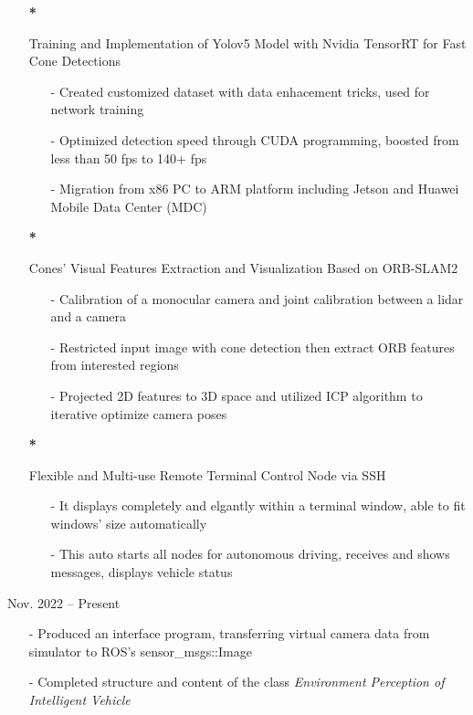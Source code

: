 \documentclass{resume}
\begin{document}
\begin{itemize}
  \item[\textbf{*}]{
    Training and Implementation of Yolov5 Model with Nvidia TensorRT for Fast Cone Detections 
    \begin{itemize}
      \item[-] Created customized dataset with data enhacement tricks, used for network training
      \item[-] Optimized detection speed through CUDA programming, boosted from less than 50 fps to 140+ fps
      \item[-] Migration from x86 PC to ARM platform including Jetson and Huawei Mobile Data Center (MDC)
    \end{itemize}
  }
  \item[\textbf{*}]{
    Cones' Visual Features Extraction and Visualization Based on ORB-SLAM2
    \begin{itemize}
      \item[-] Calibration of a monocular camera and joint calibration between a lidar and a camera
      \item[-] Restricted input image with cone detection then extract ORB features from interested regions
      \item[-] Projected 2D features to 3D space and utilized ICP algorithm to iterative optimize camera poses
    \end{itemize}
  }
  \item[\textbf{*}]{
    Flexible and Multi-use Remote Terminal Control Node via SSH
    \begin{itemize}
      \item[-] It displays completely and elgantly within a terminal window, able to fit windows' size automatically
      \item[-] This auto starts all nodes for autonomous driving, receives and shows messages, displays vehicle status
    \end{itemize}
  }
\end{itemize}


 {Nov. 2022 -- Present}
\begin{itemize}
    \item[-]  Produced an interface program, transferring virtual camera data from simulator to ROS's sensor\_msgs::Image
    \item[-]  Completed structure and content of the class \textit{Environment Perception of Intelligent Vehicle}
\end{itemize}
\end{document}
